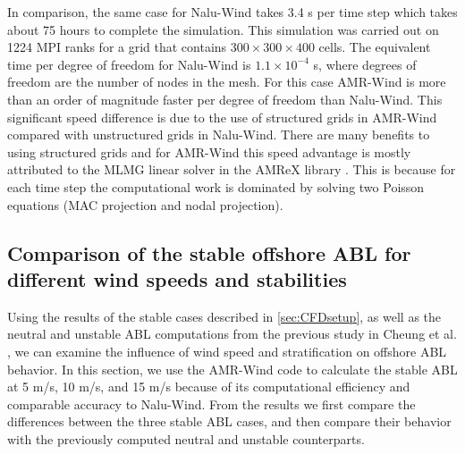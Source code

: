 In comparison, the same case for Nalu-Wind takes 3.4 s per time step which
takes about 75 hours to complete the simulation. This simulation was carried out
on 1224 MPI ranks for a grid that contains $300\times 300 \times 400$ cells. The equivalent
time per degree of freedom for Nalu-Wind is $1.1 \times 10^{-4}$ s, where degrees of freedom
are the number of nodes in the mesh. For this case AMR-Wind is more than an order of magnitude
faster per degree of freedom than Nalu-Wind. This significant speed difference is due to the use
of structured grids in AMR-Wind compared with unstructured grids in Nalu-Wind. There are many 
benefits to using structured grids and for AMR-Wind this speed advantage is mostly attributed
 to the MLMG linear solver in the AMReX library \cite{AMReX_JOSS}. This is because for each 
 time step the computational work is dominated by solving two Poisson equations (MAC projection and nodal projection). 


\subsection{Comparison of the stable offshore ABL for different wind speeds and stabilities}

Using the results of the stable cases described in \ref{sec:CFDsetup},
as well as the neutral and unstable ABL computations from the previous
study in Cheung et al. \cite{cheung2020large}, we can examine the
influence of wind speed and stratification on offshore ABL behavior.
In this section, we use the AMR-Wind code to calculate the stable ABL
at 5 m/s, 10 m/s, and 15 m/s because of its computational efficiency
and comparable accuracy to Nalu-Wind.  From the results we first
compare the differences between the three stable ABL cases, and then
compare their behavior with the previously computed neutral and
unstable counterparts.

